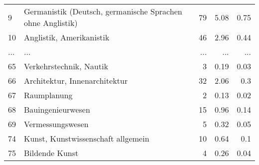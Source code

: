 \begin{longtable}{lXrrr}
        9 & \multicolumn{1}{X}{Germanistik (Deutsch, germanische Sprachen ohne Anglistik)} & %
          \num{79} &
          \num[round-mode=places,round-precision=2]{5.08} &
          \num[round-mode=places,round-precision=2]{0.75} \\
        10 & \multicolumn{1}{X}{Anglistik, Amerikanistik} & %
          \num{46} &
          \num[round-mode=places,round-precision=2]{2.96} &
          \num[round-mode=places,round-precision=2]{0.44} \\
       ... & ... & ... & ... & ... \\
        65 & \multicolumn{1}{X}{Verkehrstechnik, Nautik} & %
          \num{3} &
          \num[round-mode=places,round-precision=2]{0.19} &
          \num[round-mode=places,round-precision=2]{0.03} \\

        66 & \multicolumn{1}{X}{Architektur, Innenarchitektur} & %
          \num{32} &
          \num[round-mode=places,round-precision=2]{2.06} &
          \num[round-mode=places,round-precision=2]{0.3} \\

        67 & \multicolumn{1}{X}{Raumplanung} & %
          \num{2} &
          \num[round-mode=places,round-precision=2]{0.13} &
          \num[round-mode=places,round-precision=2]{0.02} \\

        68 & \multicolumn{1}{X}{Bauingenieurwesen} & %
          \num{15} &
          \num[round-mode=places,round-precision=2]{0.96} &
          \num[round-mode=places,round-precision=2]{0.14} \\

        69 & \multicolumn{1}{X}{Vermessungswesen} & %
          \num{5} &
          \num[round-mode=places,round-precision=2]{0.32} &
          \num[round-mode=places,round-precision=2]{0.05} \\

        74 & \multicolumn{1}{X}{Kunst, Kunstwissenschaft allgemein} & %
          \num{10} &
          \num[round-mode=places,round-precision=2]{0.64} &
          \num[round-mode=places,round-precision=2]{0.1} \\

        75 & \multicolumn{1}{X}{Bildende Kunst} & %
          \num{4} &
          \num[round-mode=places,round-precision=2]{0.26} &
          \num[round-mode=places,round-precision=2]{0.04} \\


\end{longtable}
